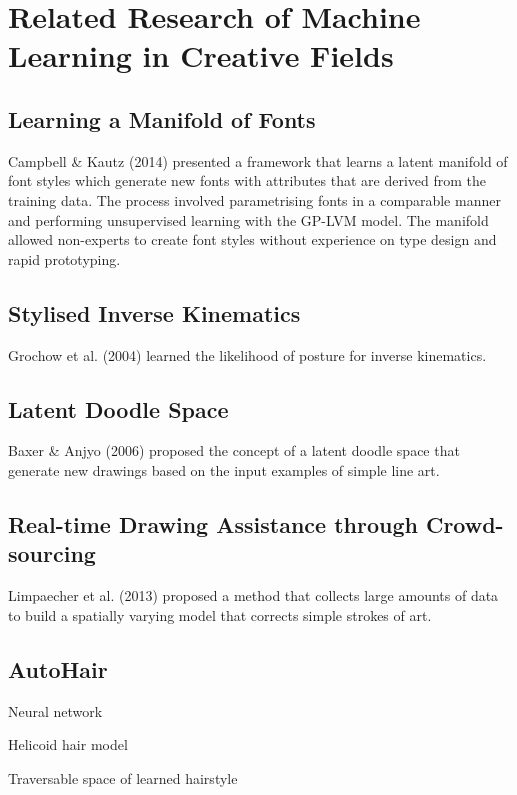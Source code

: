 \documentclass[ %
                    author={Dillon Keith Diep [INCOMPLETE DRAFT, NOT FOR SUBMISSION]},
                supervisor={Dr. Carl Henrik Ek},
                    degree={MEng},
                     title={ART-CG:},
                  subtitle={Assisted Real-Time Content Generation of 3D Hair Geometry},
                      type={Research},
                      year={2014} ]{dissertation}
\begin{document}
\section{Related Research of Machine Learning in Creative Fields}
{\color{red}
\subsection{Learning a Manifold of Fonts}
Campbell \& Kautz (2014) presented a framework that learns a latent manifold of font styles which generate new fonts with attributes that are derived from the training data. \cite{fontmanifold} The process involved parametrising fonts in a comparable manner and performing unsupervised learning with the GP-LVM model. The manifold allowed non-experts to create font styles without experience on type design and rapid prototyping.

\subsection{Stylised Inverse Kinematics}
Grochow et al. (2004) learned the likelihood of posture for inverse kinematics. \cite{styleik}

\subsection{Latent Doodle Space}
Baxer \& Anjyo (2006) proposed the concept of a latent doodle space that generate new drawings based on the input examples of simple line art. \cite{latentdoodle}

\subsection{Real-time Drawing Assistance through Crowd-sourcing}
\cite{mlmethods}
Limpaecher et al. (2013) proposed a method that collects large amounts of data to build a spatially varying model that corrects simple strokes of art.

\subsection{AutoHair}
\cite{autohair}
Neural network

Helicoid hair model

Traversable space of learned hairstyle
}
\end{document}
